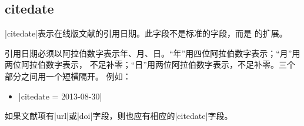 
\subsection{citedate}\label{subsec:bibfield-citedate}

|citedate|表示在线版文献的引用日期。此字段不是标准的{\BibTeX}字段，而是{\njuthesis}
的扩展。

引用日期必须以阿拉伯数字表示年、月、日。“年”用四位阿拉伯数字表示；“月”用两位阿拉伯数字表示，
不足补零；“日”用两位阿拉伯数字表示，不足补零。三个部分之间用一个短横隔开。
例如：
\begin{itemize}
\item |citedate = {2013-08-30}|
\end{itemize}

如果文献项有|url|或|doi|字段，则也应有相应的|citedate|字段。

